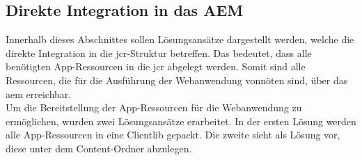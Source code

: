 \subsection{Direkte Integration in das AEM}
\label{sec:direkte-integration-in-das-aem}
Innerhalb dieses Abschnittes sollen Lösungsansätze dargestellt werden, welche die direkte Integration in die \ac{jcr}-Struktur betreffen. Das bedeutet, dass alle benötigten App-Ressourcen in die \ac{jcr} abgelegt werden. Somit sind alle Ressourcen, die für die Ausführung der Webanwendung vonnöten sind, über das \ac{aem} erreichbar.\\
Um die Bereitstellung der App-Ressourcen für die Webanwendung zu ermöglichen, wurden zwei Lösungsansätze erarbeitet. In der ersten Lösung werden alle App-Ressourcen in eine Clientlib gepackt. Die zweite sieht als Lösung vor, diese unter dem Content-Ordner abzulegen.



